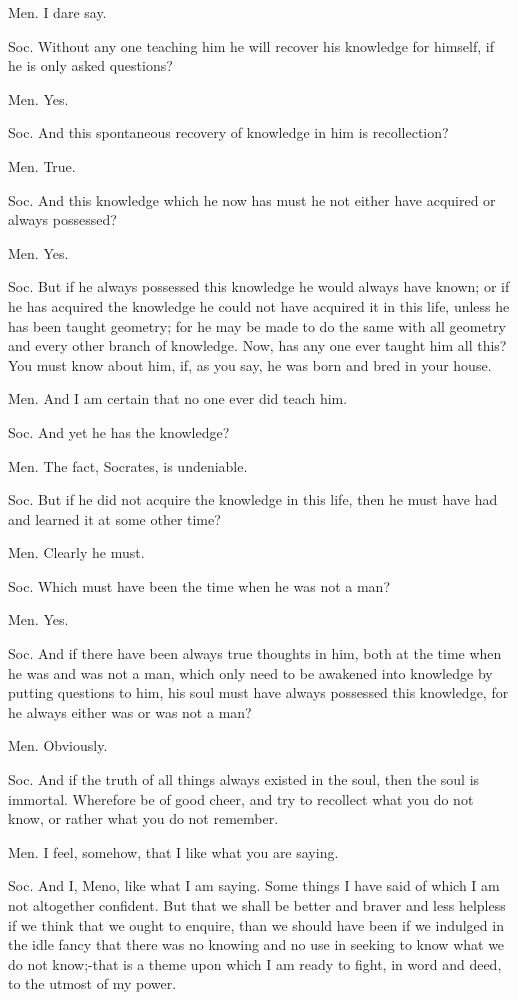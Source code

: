 Men. I dare say. 

Soc. Without any one teaching him he will recover his knowledge for
himself, if he is only asked questions? 

Men. Yes. 

Soc. And this spontaneous recovery of knowledge in him is recollection?

Men. True. 

Soc. And this knowledge which he now has must he not either have acquired
or always possessed? 

Men. Yes. 

Soc. But if he always possessed this knowledge he would always have
known; or if he has acquired the knowledge he could not have acquired
it in this life, unless he has been taught geometry; for he may be
made to do the same with all geometry and every other branch of knowledge.
Now, has any one ever taught him all this? You must know about him,
if, as you say, he was born and bred in your house. 

Men. And I am certain that no one ever did teach him. 

Soc. And yet he has the knowledge? 

Men. The fact, Socrates, is undeniable. 

Soc. But if he did not acquire the knowledge in this life, then he
must have had and learned it at some other time? 

Men. Clearly he must. 

Soc. Which must have been the time when he was not a man?

Men. Yes. 

Soc. And if there have been always true thoughts in him, both at the
time when he was and was not a man, which only need to be awakened
into knowledge by putting questions to him, his soul must have always
possessed this knowledge, for he always either was or was not a man?

Men. Obviously. 

Soc. And if the truth of all things always existed in the soul, then
the soul is immortal. Wherefore be of good cheer, and try to recollect
what you do not know, or rather what you do not remember.

Men. I feel, somehow, that I like what you are saying. 

Soc. And I, Meno, like what I am saying. Some things I have said of
which I am not altogether confident. But that we shall be better and
braver and less helpless if we think that we ought to enquire, than
we should have been if we indulged in the idle fancy that there was
no knowing and no use in seeking to know what we do not know;-that
is a theme upon which I am ready to fight, in word and deed, to the
utmost of my power. 

